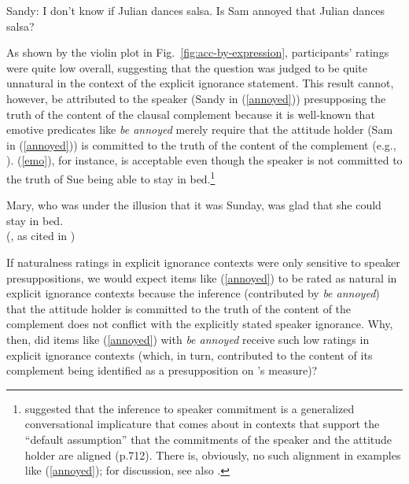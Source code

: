 \documentclass[11pt,fleqn]{article}
\newcommand{\6}{\mbox{$[\hspace*{-.6mm}[$}}
\newcommand{\9}{\mbox{$]\hspace*{-.6mm}]$}}
\newcommand{\citepos}[1]{\citeauthor{#1}'s \citeyear{#1}}
\begin{document}
\begin{exe}
\ex\label{annoyed} Sandy: I don't know if Julian dances salsa. Is Sam annoyed that Julian dances salsa?
\end{exe}
As shown by the violin plot in Fig.~\ref{fig:acc-by-expression}, participants' ratings were quite low overall, suggesting that the question was judged to be quite unnatural in the context of the explicit ignorance statement. This result cannot, however, be attributed to the speaker (Sandy in (\ref{annoyed})) presupposing the truth of the content of the clausal complement because it is well-known that emotive predicates like \emph{be annoyed} merely require that the attitude holder (Sam in (\ref{annoyed})) is committed to the truth of the content of the complement (e.g., \citealt{heim92,karttunen2016,djaerv-thesis}). (\ref{emo}), for instance, is acceptable even though the speaker is not committed to the truth of Sue being able to stay in bed.\footnote{\citealt{karttunen2016} suggested that the inference to speaker commitment is a generalized conversational implicature that comes about in contexts that support the ``default assumption'' that the commitments of the speaker and the attitude holder are aligned (p.712). There is, obviously, no such alignment in examples like (\ref{annoyed}); for discussion, see also \citealt{djaerv-thesis}.}

\begin{exe}
\ex\label{emo} 
Mary, who was under the illusion that it was Sunday, was glad that she could stay in bed. \\ \hspace*{.2cm} \hfill (\citealt{klein1975}, as cited in \citealt[122]{gazdar79a})
\end{exe}
If naturalness ratings in explicit ignorance contexts were only sensitive to speaker presuppositions, we would expect items like (\ref{annoyed}) to be rated as natural in explicit ignorance contexts because the inference (contributed by \emph{be annoyed}) that the attitude holder is committed to the truth of the content of the complement does not conflict with the explicitly stated speaker ignorance. Why, then, did items like (\ref{annoyed}) with \emph{be annoyed} receive such low  ratings in explicit ignorance contexts (which, in turn, contributed to the content of its complement being identified as a presupposition on \citepos{mandelkern-etal2020} measure)? 
\end{document}
